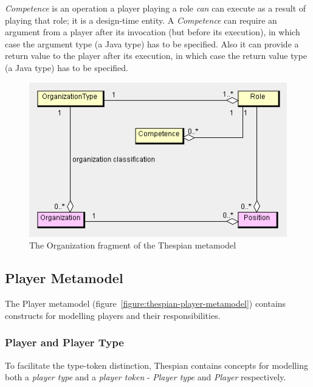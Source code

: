 \textit{Competence} is an operation a player playing a role \textit{can} can execute as a result of playing that role; it is a design-time entity.
A \textit{Competence} can require an argument from a player after its invocation (but before its execution), in which case the argument type (a Java type) has to be specified.
Also it can provide a return value to the player after its execution, in which case the return value type (a Java type) has to be specified.

\begin{figure}[ht]
	\centering
	\includegraphics[width=\textwidth]{images/thespian/organization-metamodel.png}
	\caption{The Organization fragment of the Thespian metamodel}
	\label{figure:thespian-organization-metamodel}
\end{figure}

\subsection{Player Metamodel}

The Player metamodel (figure~\ref{figure:thespian-player-metamodel}) contains constructs for modelling players and their responsibilities.

\subsubsection*{Player and Player Type}

To facilitate the type-token distinction, Thespian contains concepts for modelling both a \textit{player type} and a \textit{player token} - \textit{Player type} and \textit{Player} respectively.

